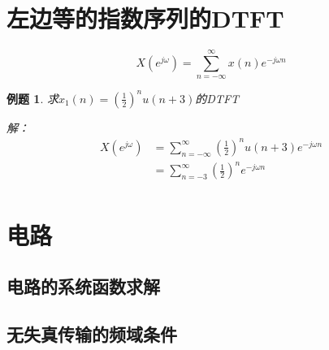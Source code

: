 \documentclass[UTF8]{ctexart}
\newtheorem{example}{例题}[section]
\begin{document}
    \section{左边等的指数序列的DTFT}
    \begin{equation*}
        X(e^{j\omega}) = \sum_{n= -\infty}^{\infty}x(n)e^{-j\omega n}
    \end{equation*}

    \begin{tcolorbox}[blue]
        \begin{example}
            求$x_1(n) = (\frac{1}{2})^n u(n+3)$的DTFT

            解：
            \begin{equation*}
                \begin{aligned}
                    X(e^{j\omega}) 
                    &= \sum_{n = - \infty}^{\infty}(\frac{1}{2})^n u(n+3) e^{-j\omega n}\\
                    &= \sum_{n = - 3}^{\infty}(\frac{1}{2})^n e^{-j\omega n}\\
                \end{aligned}
            \end{equation*}
        \end{example}
    \end{tcolorbox}

    \section{电路}

    \subsection{电路的系统函数求解}

    \subsection{无失真传输的频域条件}
\end{document}
